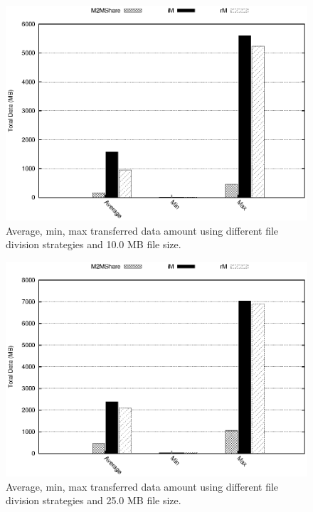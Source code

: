 \begin{figure}[htpb]
  \begin{center}
    \includegraphics[scale=1]{grafici/dataDFS_10MB.eps}
    \caption{Average, min, max transferred data amount using different file division strategies and 10.0 MB file size.}
    \label{graficoDataFDS_10MB}
  \end{center}
\end{figure}

\begin{figure}[htpb]
  \begin{center}
    \includegraphics[scale=1]{grafici/dataDFS_25MB.eps}
    \caption{Average, min, max transferred data amount using different file division strategies and 25.0 MB file size.}
    \label{graficoDataFDS_25MB}
  \end{center}
\end{figure}

 

